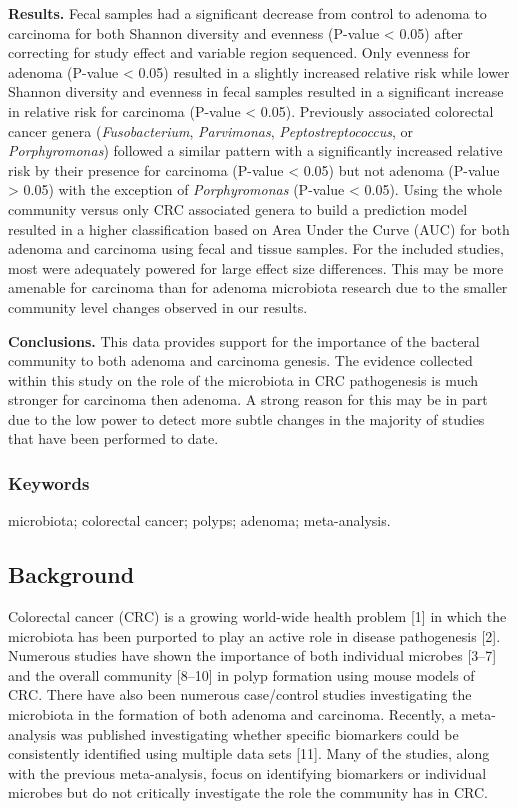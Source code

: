 \documentclass[12pt,]{article}
\begin{document}
\textbf{Results.} Fecal samples had a significant decrease from control
to adenoma to carcinoma for both Shannon diversity and evenness (P-value
\textless{} 0.05) after correcting for study effect and variable region
sequenced. Only evenness for adenoma (P-value \textless{} 0.05) resulted
in a slightly increased relative risk while lower Shannon diversity and
evenness in fecal samples resulted in a significant increase in relative
risk for carcinoma (P-value \textless{} 0.05). Previously associated
colorectal cancer genera (\emph{Fusobacterium}, \emph{Parvimonas},
\emph{Peptostreptococcus}, or \emph{Porphyromonas}) followed a similar
pattern with a significantly increased relative risk by their presence
for carcinoma (P-value \textless{} 0.05) but not adenoma (P-value
\textgreater{} 0.05) with the exception of \emph{Porphyromonas} (P-value
\textless{} 0.05). Using the whole community versus only CRC associated
genera to build a prediction model resulted in a higher classification
based on Area Under the Curve (AUC) for both adenoma and carcinoma using
fecal and tissue samples. For the included studies, most were adequately
powered for large effect size differences. This may be more amenable for
carcinoma than for adenoma microbiota research due to the smaller
community level changes observed in our results.

\textbf{Conclusions.} This data provides support for the importance of
the bacteral community to both adenoma and carcinoma genesis. The
evidence collected within this study on the role of the microbiota in
CRC pathogenesis is much stronger for carcinoma then adenoma. A strong
reason for this may be in part due to the low power to detect more
subtle changes in the majority of studies that have been performed to
date.

\subsubsection{Keywords}\label{keywords}

microbiota; colorectal cancer; polyps; adenoma; meta-analysis.

\newpage

\subsection{Background}\label{background}

Colorectal cancer (CRC) is a growing world-wide health problem {[}1{]}
in which the microbiota has been purported to play an active role in
disease pathogenesis {[}2{]}. Numerous studies have shown the importance
of both individual microbes {[}3--7{]} and the overall community
{[}8--10{]} in polyp formation using mouse models of CRC. There have
also been numerous case/control studies investigating the microbiota in
the formation of both adenoma and carcinoma. Recently, a meta-analysis
was published investigating whether specific biomarkers could be
consistently identified using multiple data sets {[}11{]}. Many of the
studies, along with the previous meta-analysis, focus on identifying
biomarkers or individual microbes but do not critically investigate the
role the community has in CRC.
\end{document}
